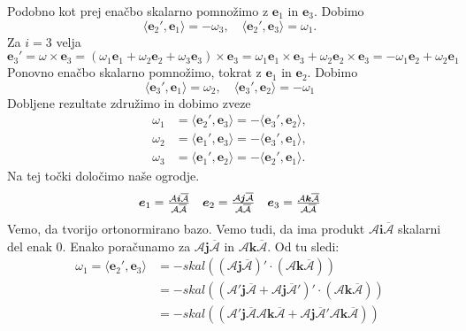 \documentclass[mat1]{fmfdelo}
\newcommand{\ii}{\boldsymbol i}
\newcommand{\jj}{\boldsymbol j}
\newcommand{\kk}{\boldsymbol k}
\newcommand{\e}{\boldsymbol e}
\newcommand{\A}{\mathcal A}
\begin{document}
\begin{dokaz}
Podobno kot prej enačbo skalarno pomnožimo z $\e_1$ in $\e_3$. Dobimo
\begin{equation*}
\langle \e_2', \e_1 \rangle  = -\omega_3, \quad 
\langle \e_2', \e_3 \rangle = \omega_1.
\end{equation*}
Za $i=3$ velja
\begin{equation*}
\e_3' = \omega \times \e_3 = (\omega_1 \e_1 + \omega_2 \e_2 + \omega_3 \e_3) \times \e_3 =
\omega_1 \e_1 \times \e_3 + \omega_2 \e_2 \times \e_3
= - \omega_1\e_2 + \omega_2\e_1
\end{equation*}
Ponovno enačbo skalarno pomnožimo, tokrat z $\e_1$ in $\e_2$. Dobimo
\begin{equation*}
\langle \e_3', \e_1 \rangle  = \omega_2, \quad
\langle \e_3', \e_2 \rangle = -\omega_1
\end{equation*}
Dobljene rezultate združimo in dobimo zveze
\begin{equation}
\begin{split}
\omega_1 &= \langle \e_2', \e_3 \rangle = - \langle \e_3', \e_2 \rangle, \\
\omega_2 &= \langle \e_1', \e_3 \rangle = - \langle \e_3', \e_1 \rangle, \\
\omega_3 &= \langle \e_1', \e_2 \rangle = - \langle \e_2', \e_1 \rangle. 
\end{split}
\end{equation}
Na tej točki določimo naše ogrodje.
\begin{equation*}
\begin{array}{c c c}
\e_1 = \frac{\A \ii \overline{\A}}{\A \overline{\A}} &
\e_2 = \frac{\A \jj \overline{\A}}{\A \overline{\A}} &
\e_3 = \frac{\A \kk \overline{\A}}{\A \overline{\A}}
\end{array}
\end{equation*}
Vemo, da tvorijo ortonormirano bazo. Vemo tudi, da ima produkt $\A \ii \overline{\A}$ skalarni del enak 0. Enako poračunamo za $\A \jj \overline{\A}$ in $\A \kk \overline{\A}$. Od tu sledi:
\begin{equation*}
\begin{split}
	\omega_1 = \langle \e_2', \e_3 \rangle& = -skal \left( \left( \A \jj \overline{\A} \right)' \cdot \left( \A \kk \overline{\A}  \right) \right) \\
	&= -skal \left( \left( \A' \jj \overline{\A} + \A \jj \overline{\A}' \right)' \cdot \left( \A \kk \overline{\A}  \right) \right) \\
	&= -skal \left( \left( \A' \jj \overline{\A} \A \kk \overline{\A}+ \A \jj \overline{\A}' \A \kk \overline{\A}  \right) \right) \\

\end{split}
\end{equation*}
\end{dokaz}
\end{document}
